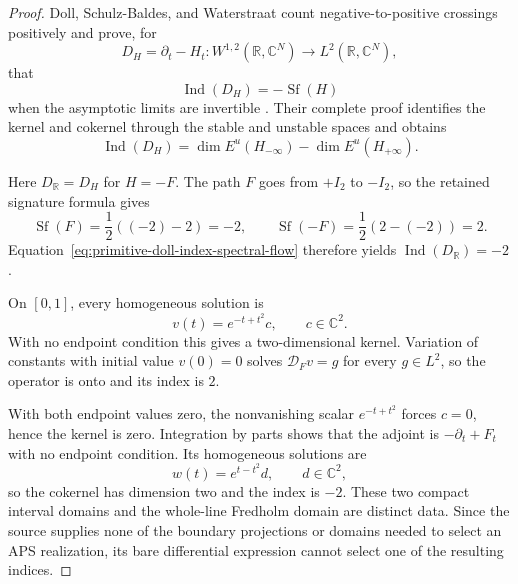 \begin{proof}
Doll, Schulz-Baldes, and Waterstraat count negative-to-positive crossings
positively and prove, for
\[
 D_H=\partial_t-H_t:W^{1,2}(\mathbb R,\mathbb C^N)\to
 L^2(\mathbb R,\mathbb C^N),
\]
that
\begin{equation}
 \operatorname{Ind}(D_H)=-\operatorname{Sf}(H)
 \label{eq:primitive-doll-index-spectral-flow}
\end{equation}
when the asymptotic limits are invertible
\cite[Definition~1.1.3 and Theorem~3.5.1, pp.~3 and 78--82]
{dollSchulzBaldesWaterstraat2023}.  Their complete proof identifies the kernel
and cokernel through the stable and unstable spaces and obtains
\[
 \operatorname{Ind}(D_H)
 =\dim E^u(H_{-\infty})-\dim E^u(H_{+\infty}).
\]

Here $D_{\mathbb R}=D_H$ for $H=-F$.  The path $F$ goes from $+I_2$ to
$-I_2$, so the retained signature formula gives
\[
 \operatorname{Sf}(F)=\frac12((-2)-2)=-2,
 \qquad
 \operatorname{Sf}(-F)=\frac12(2-(-2))=2.
\]
Equation~\eqref{eq:primitive-doll-index-spectral-flow} therefore yields
$\operatorname{Ind}(D_{\mathbb R})=-2$.

On $[0,1]$, every homogeneous solution is
\[
 v(t)=e^{-t+t^2}c,\qquad c\in\mathbb C^2.
\]
With no endpoint condition this gives a two-dimensional kernel.  Variation of
constants with initial value $v(0)=0$ solves $\mathcal D_Fv=g$ for every
$g\in L^2$, so the operator is onto and its index is $2$.

With both endpoint values zero, the nonvanishing scalar
$e^{-t+t^2}$ forces $c=0$, hence the kernel is zero.  Integration by parts
shows that the adjoint is $-\partial_t+F_t$ with no endpoint condition.  Its
homogeneous solutions are
\[
 w(t)=e^{t-t^2}d,\qquad d\in\mathbb C^2,
\]
so the cokernel has dimension two and the index is $-2$.  These two compact
interval domains and the whole-line Fredholm domain are distinct data.  Since
the source supplies none of the boundary projections or domains needed to
select an APS realization, its bare differential expression cannot select
one of the resulting indices.
\end{proof}

